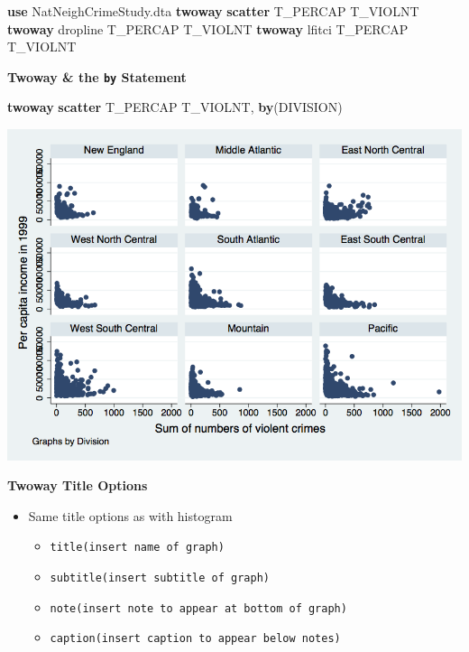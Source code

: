 \documentclass[
]{book}
\newenvironment{Shaded}{\begin{snugshade}}{\end{snugshade}}
\newcommand{\BaseNTok}[1]{\textcolor[rgb]{0.00,0.00,0.81}{#1}}
\newcommand{\KeywordTok}[1]{\textcolor[rgb]{0.13,0.29,0.53}{\textbf{#1}}}
\newcommand{\NormalTok}[1]{#1}
\providecommand{\tightlist}{%
  \setlength{\itemsep}{0pt}\setlength{\parskip}{0pt}}
\begin{document}
\begin{Shaded}
\begin{Highlighting}[]
  \KeywordTok{use}\NormalTok{ NatNeighCrimeStudy.dta}
  \KeywordTok{twoway} \KeywordTok{scatter}\NormalTok{ T_PERCAP T_VIOLNT}
  \KeywordTok{twoway} \BaseNTok{dropline}\NormalTok{ T_PERCAP T_VIOLNT}
  \KeywordTok{twoway}\NormalTok{  lfitci T_PERCAP T_VIOLNT}
\end{Highlighting}
\end{Shaded}

\textbf{Twoway \& the \texttt{by} Statement}

\begin{Shaded}
\begin{Highlighting}[]
  \KeywordTok{twoway} \KeywordTok{scatter}\NormalTok{ T_PERCAP T_VIOLNT, }\KeywordTok{by}\NormalTok{(DIVISION)}
\end{Highlighting}
\end{Shaded}

\includegraphics{Stata/StataModGraph/images/twowayby.png}

\textbf{Twoway Title Options}

\begin{itemize}
\tightlist
\item
  Same title options as with histogram

  \begin{itemize}
  \tightlist
  \item
    \texttt{title(insert\ name\ of\ graph)}
  \item
    \texttt{subtitle(insert\ subtitle\ of\ graph)}
  \item
    \texttt{note(insert\ note\ to\ appear\ at\ bottom\ of\ graph)}
  \item
    \texttt{caption(insert\ caption\ to\ appear\ below\ notes)}
  \end{itemize}
\end{itemize}
\end{document}
